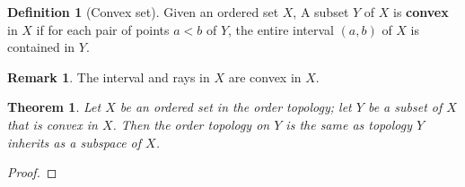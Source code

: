 \documentclass[12pt,reqno]{amsart}
\theoremstyle{plain}
\newtheorem{thm}{Theorem}
\theoremstyle{definition}
\newtheorem{defn}{Definition}
\newtheorem{rem}{Remark}
\begin{document}
\begin{defn}[Convex set]
    Given an ordered set $X$, A subset $Y$ of $X$ is {\bf convex} in $X$ if for each pair of points $a < b$ of $Y$, the entire interval $(a,b)$ of $X$ is contained in $Y$. 
\end{defn}
\begin{rem}
    The interval and rays in $X$ are convex in $X$.    
\end{rem}
\begin{thm}
    Let $X$ be an ordered set in the order topology; let $Y$ be a subset of $X$ that is convex in $X$. Then the order topology on $Y$ is the same as topology $Y$ inherits as a subspace of $X$.
\end{thm}
\begin{proof}
    
\end{proof}
\end{document}
